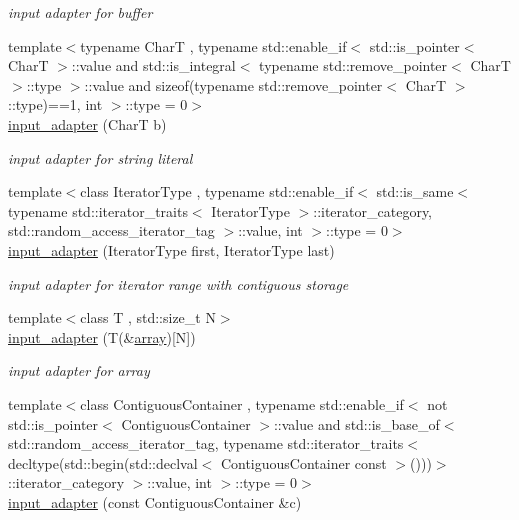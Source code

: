 \begin{DoxyCompactItemize}
\begin{DoxyCompactList}\small\item\em input adapter for buffer \end{DoxyCompactList}\item 
{\footnotesize template$<$typename CharT , typename std\+::enable\+\_\+if$<$ std\+::is\+\_\+pointer$<$ Char\+T $>$\+::value and std\+::is\+\_\+integral$<$ typename std\+::remove\+\_\+pointer$<$ Char\+T $>$\+::type $>$\+::value and sizeof(typename std\+::remove\+\_\+pointer$<$ Char\+T $>$\+::type)==1, int $>$\+::type  = 0$>$ }\\\hyperlink{classnlohmann_1_1detail_1_1input__adapter_a86f035d9c4319360014b922b5e433ced}{input\+\_\+adapter} (CharT b)
\begin{DoxyCompactList}\small\item\em input adapter for string literal \end{DoxyCompactList}\item 
{\footnotesize template$<$class Iterator\+Type , typename std\+::enable\+\_\+if$<$ std\+::is\+\_\+same$<$ typename std\+::iterator\+\_\+traits$<$ Iterator\+Type $>$\+::iterator\+\_\+category, std\+::random\+\_\+access\+\_\+iterator\+\_\+tag $>$\+::value, int $>$\+::type  = 0$>$ }\\\hyperlink{classnlohmann_1_1detail_1_1input__adapter_ad6824b0f792691f75186c527fa31a6b4}{input\+\_\+adapter} (Iterator\+Type first, Iterator\+Type last)
\begin{DoxyCompactList}\small\item\em input adapter for iterator range with contiguous storage \end{DoxyCompactList}\item 
{\footnotesize template$<$class T , std\+::size\+\_\+t N$>$ }\\\hyperlink{classnlohmann_1_1detail_1_1input__adapter_aa2392138bf8307df1994dc7eb22d51ce}{input\+\_\+adapter} (T(\&\hyperlink{namespacenlohmann_1_1detail_a1ed8fc6239da25abcaf681d30ace4985af1f713c9e000f5d3f280adbd124df4f5}{array})\mbox{[}N\mbox{]})
\begin{DoxyCompactList}\small\item\em input adapter for array \end{DoxyCompactList}\item 
{\footnotesize template$<$class Contiguous\+Container , typename std\+::enable\+\_\+if$<$ not std\+::is\+\_\+pointer$<$ Contiguous\+Container $>$\+::value and std\+::is\+\_\+base\+\_\+of$<$ std\+::random\+\_\+access\+\_\+iterator\+\_\+tag, typename std\+::iterator\+\_\+traits$<$ decltype(std\+::begin(std\+::declval$<$ Contiguous\+Container const $>$()))$>$\+::iterator\+\_\+category $>$\+::value, int $>$\+::type  = 0$>$ }\\\hyperlink{classnlohmann_1_1detail_1_1input__adapter_a6f92fe82cb49a508dbfb297c5630cc7f}{input\+\_\+adapter} (const Contiguous\+Container \&c)

\end{DoxyCompactItemize}
